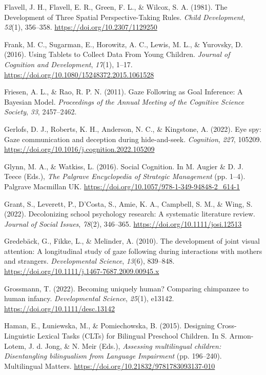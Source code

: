 \documentclass[
]{scrbook}
\newlength{\cslhangindent}
\newenvironment{CSLReferences}[2] %
 {\begin{list}{}{%
  \setlength{\itemindent}{0pt}
  \setlength{\leftmargin}{0pt}
  \setlength{\parsep}{0pt}
  \ifodd #1
   \setlength{\leftmargin}{\cslhangindent}
   \setlength{\itemindent}{-1\cslhangindent}
  \fi
  \setlength{\itemsep}{#2\baselineskip}}}
 {\end{list}}
\begin{document}
\begin{CSLReferences}{1}{0}
Flavell, J. H., Flavell, E. R., Green, F. L., \& Wilcox, S. A. (1981). The {Development} of {Three Spatial Perspective-Taking Rules}. \emph{Child Development}, \emph{52}(1), 356--358. \url{https://doi.org/10.2307/1129250}

Frank, M. C., Sugarman, E., Horowitz, A. C., Lewis, M. L., \& Yurovsky, D. (2016). Using {Tablets} to {Collect Data From Young Children}. \emph{Journal of Cognition and Development}, \emph{17}(1), 1--17. \url{https://doi.org/10.1080/15248372.2015.1061528}

Friesen, A. L., \& Rao, R. P. N. (2011). Gaze {Following} as {Goal Inference}: {A Bayesian Model}. \emph{Proceedings of the Annual Meeting of the Cognitive Science Society}, \emph{33}, 2457--2462.

Gerlofs, D. J., Roberts, K. H., Anderson, N. C., \& Kingstone, A. (2022). Eye spy: {Gaze} communication and deception during hide-and-seek. \emph{Cognition}, \emph{227}, 105209. \url{https://doi.org/10.1016/j.cognition.2022.105209}

Glynn, M. A., \& Watkiss, L. (2016). Social {Cognition}. In M. Augier \& D. J. Teece (Eds.), \emph{The {Palgrave Encyclopedia} of {Strategic Management}} (pp. 1--4). Palgrave Macmillan UK. \url{https://doi.org/10.1057/978-1-349-94848-2_614-1}

Grant, S., Leverett, P., D'Costa, S., Amie, K. A., Campbell, S. M., \& Wing, S. (2022). Decolonizing school psychology research: {A} systematic literature review. \emph{Journal of Social Issues}, \emph{78}(2), 346--365. \url{https://doi.org/10.1111/josi.12513}

Gredebäck, G., Fikke, L., \& Melinder, A. (2010). The development of joint visual attention: A longitudinal study of gaze following during interactions with mothers and strangers. \emph{Developmental Science}, \emph{13}(6), 839--848. \url{https://doi.org/10.1111/j.1467-7687.2009.00945.x}

Grossmann, T. (2022). Becoming uniquely human? {Comparing} chimpanzee to human infancy. \emph{Developmental Science}, \emph{25}(1), e13142. \url{https://doi.org/10.1111/desc.13142}

Haman, E., Łuniewska, M., \& Pomiechowska, B. (2015). Designing {Cross-Linguistic Lexical Tasks} ({CLTs}) for {Bilingual Preschool Children}. In S. Armon-Lotem, J. d. Jong, \& N. Meir (Eds.), \emph{Assessing multilingual children: {Disentangling} bilingualism from {Language Impairment}} (pp. 196--240). Multilingual Matters. \url{https://doi.org/10.21832/9781783093137-010}


\end{CSLReferences}
\end{document}
